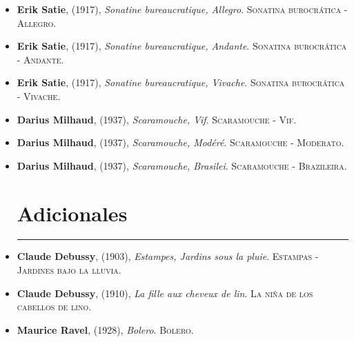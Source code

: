 \documentclass[paper=a4, fontsize=11pt, spanish]{scrartcl}
\numberwithin{equation}{section} %
\numberwithin{figure}{section} %
\numberwithin{table}{section} %
\newcommand{\horrule}[1]{\rule{\linewidth}{#1}}
\begin{document}
\begin{itemize}
\item \textbf{Erik Satie}, (1917), \textit{Sonatine bureaucratique, Allegro}.\textsc{ Sonatina burocrática - Allegro}. %
\item \textbf{Erik Satie}, (1917), \textit{Sonatine bureaucratique, Andante}.\textsc{ Sonatina burocrática - Andante}. %
\item \textbf{Erik Satie}, (1917), \textit{Sonatine bureaucratique, Vivache}.\textsc{ Sonatina burocrática - Vivache}. %
\item \textbf{Darius Milhaud}, (1937), \textit{Scaramouche, Vif}.\textsc{ Scaramouche - Vif}. %
\item \textbf{Darius Milhaud}, (1937), \textit{Scaramouche, Modéré}.\textsc{ Scaramouche - Moderato}. %
\item \textbf{Darius Milhaud}, (1937), \textit{Scaramouche, Brasilei}.\textsc{ Scaramouche - Brazileira}. %

\section{Adicionales}
\horrule{0.5pt}

\item \textbf{Claude Debussy}, (1903), \textit{Estampes, Jardins sous la pluie}.\textsc{ Estampas - Jardines bajo la lluvia}. %
\item \textbf{Claude Debussy}, (1910), \textit{La fille aux cheveux de lin}.\textsc{ La niña de los cabellos de lino}. %
\item \textbf{Maurice Ravel}, (1928), \textit{Bolero}.\textsc{ Bolero}. %

\end{itemize}
\end{document}

